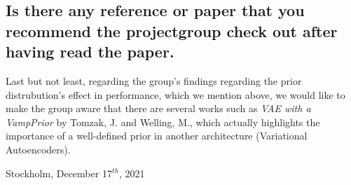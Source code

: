 \documentclass{article}
\begin{document}
\subsection{Is there any reference or paper that you recommend the projectgroup check out after having read the paper.}
Last but not least, regarding the group's findings regarding the prior distrubution's effect in performance, which we mention above, we would like to make the group aware that there are several works such as \textit{VAE with a VampPrior} by Tomzak, J. and Welling, M., which actually highlights the importance of a well-defined prior in another architecture (Variational Autoencoders).
 
\begin{flushright}
Stockholm, December 17$^{th}$, 2021
\end{flushright}

%
%
\end{document}
